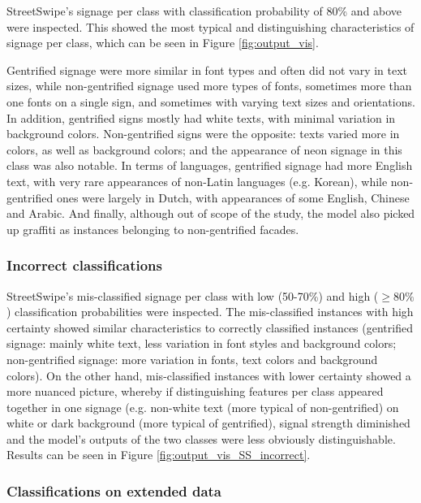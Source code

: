 StreetSwipe's signage per class with classification probability of 80\% and above were inspected. This showed the most typical and distinguishing characteristics of signage per class, which can be seen in Figure \ref{fig:output_vis}.

Gentrified signage were more similar in font types and often did not vary in text sizes, while non-gentrified signage used more types of fonts, sometimes more than one fonts on a single sign, and sometimes with varying text sizes and orientations. In addition, gentrified signs mostly had white texts, with minimal variation in background colors. Non-gentrified signs were the opposite: texts varied more in colors, as well as background colors; and the appearance of neon signage in this class was also notable. In terms of languages, gentrified signage had more English text, with very rare appearances of non-Latin languages (e.g. Korean), while non-gentrified ones were largely in Dutch, with appearances of some English, Chinese and Arabic. And finally, although out of scope of the study, the model also picked up graffiti as instances belonging to non-gentrified facades.


\subsubsection{Incorrect classifications} 

StreetSwipe's mis-classified signage per class with low (50-70\%) and high ($ \geq 80\% $) classification probabilities were inspected. The mis-classified instances with high certainty showed similar characteristics to correctly classified instances (gentrified signage: mainly white text, less variation in font styles and background colors; non-gentrified signage: more variation in fonts, text colors and background colors). On the other hand, mis-classified instances with lower certainty showed a more nuanced picture, whereby if distinguishing features per class appeared together in one signage (e.g. non-white text (more typical of non-gentrified) on white or dark background (more typical of gentrified), signal strength diminished and the model's outputs of the two classes were less obviously distinguishable. Results can be seen in Figure \ref{fig:output_vis_SS_incorrect}.


\subsubsection{Classifications on extended data}

